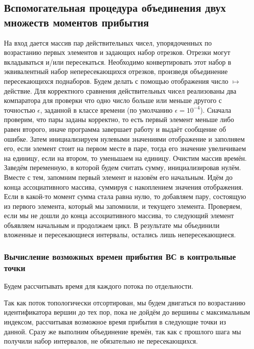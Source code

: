 \documentclass[12pt]{article}
\theoremstyle{plain}
\begin{document}


\subsection{Вспомогательная процедура объединения двух множеств моментов прибытия}

На вход дается массив пар действительных чисел, упорядоченных по возрастанию первых элементов и задающих набор отрезков. Отрезки могут вкладываться и/или пересекаться. Необходимо конвертировать этот набор в эквивалентный набор непересекающихся отрезков, произведя объединение пересекающихся поднаборов. Будем делать с помощью отображения число $\mapsto$ действие. Для корректного сравнения действительных чисел реализованы два компаратора для проверки что одно число больше или меньше другого с точностью $\epsilon$, заданной в классе времени (по умолчанию $\epsilon = 10^{-4}$). Сначала проверим, что пары заданы корректно, то есть первый элемент меньше либо равен второго, иначе программа завершает работу и выдаёт сообщение об ошибке. Затем инициализируем нулевыми значениями отображение и заполняем его, если элемент стоит на первом месте в паре, тогда его значение увеличиваем на единицу, если на втором, то уменьшаем на единицу. Очистим массив времён. Заведём переменную, в которой будем считать сумму, инициализировав нулём. Вместе с тем, запомним первый элемент и назовём его начальным. Идём до конца ассоциативного массива, суммируя с накоплением значения отображения. Если в какой-то момент сумма стала равна нулю, то добавляем пару, состоящую из первого элемента, который мы запомнили, и текущего элемента. Проверяем, если мы не дошли до конца ассоциативного массива, то следующий элемент объявляем начальным и продолжаем цикл. В результате мы объединили вложенные и пересекающиеся интервалы, остались лишь непересекающиеся.




\subsubsection{Вычисление возможных времен прибытия ВС в контрольные точки}

Будем рассчитывать время для каждого потока по отдельности.

Так как поток топологически отсортирован, мы будем двигаться по возрастанию идентификатора вершин до тех пор, пока не дойдём до вершины с максимальным индексом, рассчитывая возможное время прибытия в следующие точки из данной. Сразу же выполним объединение времён, так как с прошлого шага мы получили набор интервалов, не обязательно не пересекающихся. 
\end{document}
